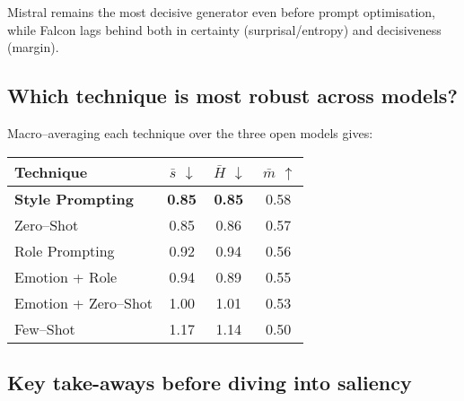 \documentclass[12pt]{article}
\begin{document}
\noindent
Mistral remains the most decisive generator even before prompt optimisation, while Falcon lags behind both in certainty (surprisal/entropy) and decisiveness (margin).

\subsection{Which technique is most robust across models?}

Macro–averaging each technique over the three open models gives:

\begin{center}
\begin{tabular}{lccc}
\toprule
\textbf{Technique} & $\,\bar s$ $\downarrow$ & $\,\bar H$ $\downarrow$ & $\,\bar m$ $\uparrow$ \\
\midrule
\textbf{Style Prompting}        & \textbf{0.85} & \textbf{0.85} & 0.58 \\
Zero–Shot                       & 0.85 & 0.86 & 0.57 \\
Role Prompting                  & 0.92 & 0.94 & 0.56 \\
Emotion + Role                  & 0.94 & 0.89 & 0.55 \\
Emotion + Zero–Shot             & 1.00 & 1.01 & 0.53 \\
Few–Shot                        & 1.17 & 1.14 & 0.50 \\
\bottomrule
\end{tabular}
\end{center}

\subsection{Key take-aways before diving into saliency}
\end{document}
